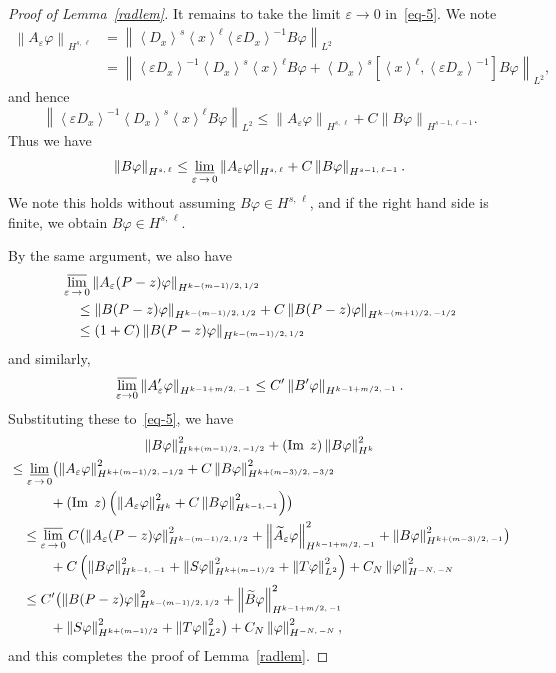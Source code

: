 \documentclass[10pt]{amsart}
\theoremstyle{definition}
\newcommand*\e{\varepsilon}
\newcommand*\f{\varphi}
\DeclareMathOperator{\Iml}{Im\;}
\newcommand{\jap}[1]{\left\langle #1 \right\rangle}
\newcommand{\norm}[1]{\left\| #1 \right\|}
\newcommand{\bigpare}[1]{\bigl(#1\bigr)}
\let\oldtilde\tilde
\renewcommand*{\tilde}[1]{\mathchoice{\widetilde{#1}}{\widetilde{#1}}{\oldtilde{#1}}{\oldtilde{#1}}}
\begin{document}
\begin{proof}[Proof of Lemma~\ref{radlem}]
It remains to take the limit $\e\to 0$ in~\eqref{eq-5}. We note
\begin{align*}
\norm{A_\e \f}_{H^{s,\,\ell}} &=
\left\|\jap{D_x}^s\jap{x}^\ell \jap{\e D_x}^{-1}B\f\right\|_{L^2} \\
&= \left\|\jap{\e D_x}^{-1}\jap{D_x}^s\jap{x}^\ell B\f+
\jap{D_x}^s\left[\jap{x}^\ell, \jap{\e D_x}^{-1}\right]B\f\right\|_{L^2},
\end{align*}
and hence
\[
\left\|\jap{\e D_x}^{-1}\jap{D_x}^s\jap{x}^\ell B\f\right\|_{L^2}
\leq \norm{A_\e\f}_{H^{s,\,\ell}} + C\norm{B\f}_{H^{s-1,\ell-1}}.
\]
Thus we have
\[
\norm{B\f}_{H^{s,\,\ell}}\leq \varliminf_{\e\,\to\,0} \norm{A_\e\f}_{H^{s,\,\ell}} +C\norm{B\f}_{H^{s-1,\,\ell-1}}.
\]
We note this holds without assuming $B\f\in H^{s,\,\ell}$, and if the right hand side is finite, we obtain $B\f\in H^{s,\,\ell}$.

By the same argument, we also have
\begin{align*}
&\varlimsup_{\e\,\to\,0} \norm{A_\e(P-z)\f}_{H^{k-(m-1)/2,\,1/2} }\\
&\quad \leq \norm{B(P-z)\f}_{H^{k-(m-1)/2,\,1/2}} + C\norm{B(P-z)\f}_{H^{k-(m+1)/2,\,-1/2} }\\
&\quad \leq (1+C) \norm{B(P-z)\f}_{H^{k-(m-1)/2,\,1/2}}
\end{align*}
and similarly,
\[
\varlimsup_{\e\to 0} \norm{A_\e'\f}_{H^{k-1+m/2,\,-1} }
\leq C' \norm{B'\f}_{H^{k-1+m/2,\,-1} }.
\]
Substituting these to~\eqref{eq-5}, we have
\begin{multline*}
\norm{B\f}^2_{H^{k+(m-1)/2,\,-1/2}}+(\Iml z)\norm{B\f}^2_{H^{k}} \\
\begin{aligned}
&\leq \varliminf_{\e\,\to\,0} \bigpare{\norm{A_\e\f}^2_{H^{k+(m-1)/2,\,-1/2}} +C\norm{B\f}^2_{H^{k+(m-3)/2,\,-3/2}}\\
&\quad\quad\quad + (\Iml z)\left(\norm{A_\e\f}^2_{H^{k}}+C\norm{B\f}^2_{H^{k-1,-1}}\right)}\\
&\quad \leq \varlimsup_{\e\,\to\,0}C \bigpare{ \norm{A_\e(P-z)\f}^2_{H^{k-(m-1)/2,\,1/2}} +\norm{\tilde A_\e \f}^2_{H^{k-1+m/2,\,-1}}+\norm{B\f}^2_{H^{k+(m-3)/2,\,-1}}} \\
&\quad\quad\quad +C\left(\norm{B\f}^2_{H^{k-1,\,-1}}+\norm{S\f}^2_{H^{k+(m-1)/2}}+\norm{T\f}_{L^2}^2\right) +C_N \norm{\f}_{H^{-N,\,-N}}^2\\
&\quad \leq C'\bigpare{\norm{B(P-z)\f}_{H^{k-(m-1)/2,\,1/2}}^2 +\norm{\tilde B\f}_{H^{k-1+m/2,\,-1}}^2 \\
&\quad \quad \quad +\norm{S\f}_{H^{k+(m-1)/2}}^2 +\norm{T\f}_{L^2}^2} +C_N \norm{\f}_{H^{-N,\,-N}}^2,
\end{aligned}
\end{multline*}
and this completes the proof of Lemma~\ref{radlem}.
\end{proof}
\end{document}
